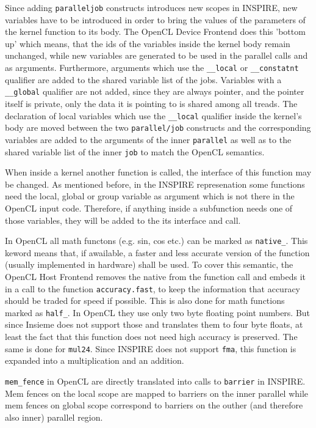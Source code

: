 Since adding \texttt{parallel\/job} constructs introduces new scopes in INSPIRE, new variables have to be introduced in order to bring the values of the parameters of the kernel function to its body. The OpenCL Device Frontend does this 'bottom up' which means, that the ids of the variables inside the kernel body remain unchanged, while new variables are generated to be used in the parallel calls and as arguments. Furthermore, arguments which use the \texttt{\_\_local} or \texttt{\_\_constatnt} qualifier are added to the shared variable list of the jobs. Variables with a \texttt{\_\_global} qualifier are not added, since they are always pointer, and the pointer itself is private, only the data it is pointing to is shared among all treads. The declaration of local variables which use the \texttt{\_\_local} qualifier inside the kernel's body are moved between the two \texttt{parallel/job} constructs and the corresponding variables are added to the arguments of the inner \texttt{parallel} as well as to the shared variable list of the inner \texttt{job} to match the OpenCL semantics. 

When inside a kernel another function is called, the interface of this function may be changed. As mentioned before, in the INSPIRE represenation some functions need the local, global or group variable as argument which is not there in the OpenCL input code. Therefore, if anything inside a subfunction needs one of those variables, they will be added to the its interface and call.

In OpenCL all math functons (e.g. sin, cos etc.) can be marked as \texttt{native\_}. This keword means that, if awailable, a faster and less accurate version of the function (usually implemented in hardware) shall be used. To cover this semantic, the OpenCL Host Frontend removes the native from the function call and embeds it in a call to the function \texttt{accuracy.fast}, to keep the information that accuracy should be traded for speed if possible. This is also done for math functions marked as \texttt{half\_}. In OpenCL they use only two byte floating point numbers. But since Insieme does not support those and translates them to four byte floats, at least the fact that this function does not need high accuracy is preserved. The same is done for \texttt{mul24}. Since INSPIRE does not support \texttt{fma}, this function is expanded into a multiplication and an addition.

\texttt{mem\_fence} in OpenCL are directly translated into calls to \texttt{barrier} in INSPIRE. Mem fences on the local scope are mapped to barriers on the inner parallel while mem fences on global scope correspond to barriers on the outher (and therefore also inner) parallel region.

